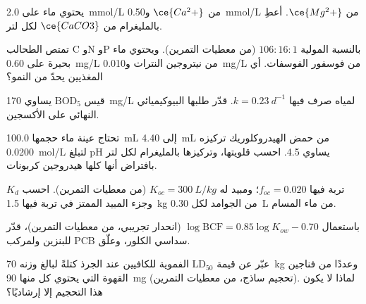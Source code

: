\begin{exercise}[$\star$]\label{exo:b3:environmental-toxicology:3}
يحتوي ماء على \qty{2.0}{mmol/L} من $\ce{Ca^2+}$ و\qty{0.50}{mmol/L} من $\ce{Mg^2+}$. أعطِ  بالمليغرام من $\ce{CaCO3}$ لكل لتر.
\end{exercise}

\begin{exercise}[$\star$]\label{exo:b3:environmental-toxicology:4}
تمتص الطحالب C وN وP بالنسبة المولية $106 : 16 : 1$ (من معطيات التمرين). ويحتوي ماء
بحيرة على \qty{0.60}{mg/L} من نيتروجين النترات و\qty{0.010}{mg/L} من فوسفور الفوسفات. أي المغذيين يحدّ
من النمو؟
\end{exercise}

\begin{exercise}[$\star\star$]\label{exo:b3:environmental-toxicology:5}
قيس $\mathrm{BOD_5}$ يساوي \qty{170}{mg/L} لمياه صرف فيها $k = \qty{0.23}{d^{-1}}$. قدّر طلبها البيوكيميائي النهائي على الأكسجين.
\end{exercise}

\begin{exercise}[$\star\star$]\label{exo:b3:environmental-toxicology:6}
تحتاج عينة ماء حجمها \qty{100.0}{mL} إلى \qty{4.40}{mL} من حمض الهيدروكلوريك تركيزه \qty{0.0200}{mol/L} لتبلغ pH يساوي 4.5. احسب
قلويتها، وتركيزها بالمليغرام لكل لتر بافتراض أنها كلها هيدروجين كربونات.
\end{exercise}

\begin{exercise}[$\star\star$]\label{exo:b3:environmental-toxicology:7}
تربة فيها $f_{oc} = 0.020$؛ ومبيد له $K_{oc} = \qty{300}{L/kg}$ (من معطيات التمرين). احسب $K_d$ 
وجزء المبيد الممتز في تربة فيها \qty{1.5}{kg} من الجوامد لكل \qty{0.30}{L} من ماء المسام.
\end{exercise}

\begin{exercise}[$\star\star$]\label{exo:b3:environmental-toxicology:8}
باستعمال $\log\mathrm{BCF} = 0.85\log K_{ow} - 0.70$ (انحدار تجريبي، من معطيات التمرين)، قدّر 
للبنزين ولمركب PCB سداسي الكلور، وعلّق.
\end{exercise}

\begin{exercise}[$\star\star$]\label{exo:b3:environmental-toxicology:9}
عبّر عن قيمة $\mathrm{LD_{50}}$ الفموية للكافيين عند الجرذ كتلةً لبالغ وزنه \qty{70}{kg} وعددًا من فناجين القهوة
التي يحتوي كل منها \qty{90}{mg} (تحجيم ساذج، من معطيات التمرين). لماذا لا يكون هذا التحجيم إلا إرشاديًا؟
\end{exercise}


